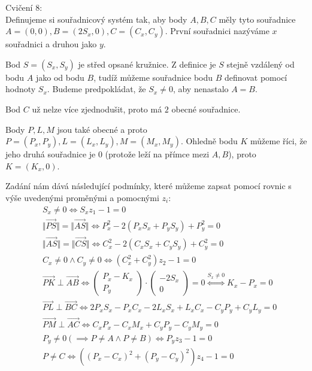 \documentclass[12pt, a4paper]{article}
\begin{document}
Cvičení 8:\\

Definujeme si souřadnicový systém tak, aby body $A, B, C$ měly tyto souřadnice $A = (0,0), B = (2S_x, 0), C = (C_x, C_y)$. První souřadnici nazýváme $x$ souřadnici a druhou jako $y$. 

Bod $S = (S_x,S_y)$ je střed opsané kružnice. Z definice je $S$ stejně vzdálený od bodu $A$ jako od bodu $B$, tudíž můžeme souřadnice bodu $B$ definovat pomocí hodnoty $S_x$. Budeme predpokládat, že $S_x \neq 0$, aby nenastalo $A=B$.

Bod $C$ už nelze více zjednodušit, proto má $2$ obecné souřadnice.

Body $P, L, M$ jsou také obecné a proto $P = (P_x, P_y), L = (L_x, L_y), M = (M_x, M_y)$. Ohledně bodu $K$ můžeme říci, že jeho druhá souřadnice je $0$ (protože leží na přímce mezi $A,B$), proto $K = (K_x, 0)$.

Zadání nám dává následující podmínky, které můžeme zapsat pomocí rovnic s výše uvedenými proměnými a pomocnými $z_i$:
\begin{align}
&S_x \neq 0 \iff S_x z_1 - 1 = 0\\
&\Vert \overrightarrow{PS} \Vert = \Vert \overrightarrow{AS} \Vert \iff P_x^2 - 2(P_xS_x + P_yS_y) + P_y^2 = 0\\
&\Vert \overrightarrow{AS} \Vert = \Vert \overrightarrow{CS} \Vert \iff C_x^2 - 2(C_xS_x + C_yS_y) + C_y^2 = 0\\
& C_x \neq 0 \land C_y \neq 0 \iff (C_x^2 +C_y^2)z_2 - 1 = 0\\ 
&\overrightarrow{PK} \perp \overrightarrow{AB} \iff 
\begin{pmatrix}
P_x - K_x \\
P_y
\end{pmatrix} \cdot  
\begin{pmatrix}
-2S_x \\
0
\end{pmatrix} = 0 \stackrel{S_x \neq 0}{\iff} K_x - P_x = 0\\
&\overrightarrow{PL} \perp \overrightarrow{BC} \iff 2P_xS_x - P_xC_x - 2L_xS_x + L_xC_x - C_yP_y + C_yL_y = 0\\
&\overrightarrow{PM} \perp \overrightarrow{AC} \iff C_xP_x - C_xM_x + C_yP_y - C_yM_y = 0\\
&P_y \neq 0 (\implies P \neq A \land P \neq B) \iff P_y z_3 - 1 = 0\\
&P \neq C \iff ((P_x - C_x)^2 + (P_y - C_y)^2)z_4 - 1 = 0
\end{align}
\end{document}
